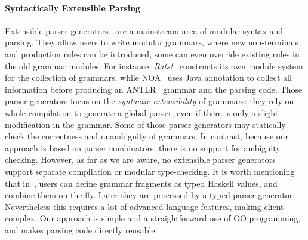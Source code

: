 \begin{comment}
Besides, type-specific languages do support
separate compilation and type safety. The modularity of parsing is incorporated in its elaborated type
system, allowing users to introduce new syntax. Whereas our approach does not rely on an extension to semantics, but simply uses a pattern
that is applicable in mainstream OO languages, where the type system ensures
type safety.
\end{comment}

\vspace{-4pt}
\paragraph{Syntactically Extensible Parsing}
Extensible parser generators~\cite{antlr1995,Grimm2006,Gouseti2014,Viera2012,Warth2016,schwerdfeger09}
are a mainstream area of modular syntax and parsing. They allow users to write
modular grammars, where new
non-terminals and production rules can be introduced, some can even
override existing rules in the old grammar modules. For instance,
\textit{Rats!}~\cite{Grimm2006} constructs its own module system for
the collection of grammars, while NOA~\cite{Gouseti2014} uses Java
annotation to collect all information before producing an ANTLR~\cite{antlr1995} grammar
and the parsing code. Those parser
generators focus on the \textit{syntactic extensibility} of grammars:
they rely on whole compilation to generate a global parser, even if
there is only a slight modification in the grammar. Some of those
parser generators may statically check the correctness and unambiguity
of grammars. In contrast, because our approach is based on parser
combinators, there is no support for ambiguity checking.  However, as
far as we are aware, no extensible parser generators support separate
compilation or modular type-checking. It is worth mentioning that in~\cite{Viera2012}, users can define
grammar fragments as typed Haskell values, and combine them on the fly. Later they are processed
by a typed parser generator. Nevertheless this requires
a lot of advanced language features, making client complex. Our
approach is simple and a straightforward use of OO programming, 
and makes parsing code directly reusable.

